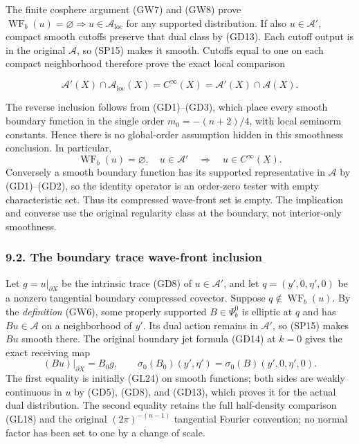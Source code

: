 \documentclass[
  11pt,
]{article}
\begin{document}
The finite cosphere argument (GW7) and (GW8) prove
\(\operatorname{WF}_b(u)=\varnothing\Rightarrow
u\in\mathcal A_{\mathrm{loc}}\) for any supported distribution. If also
\(u\in\mathcal A'\), compact smooth cutoffs preserve that dual class by
(GD13). Each cutoff output is in the original \(\mathcal A\), so (SP15)
makes it smooth. Cutoffs equal to one on each compact neighborhood
therefore prove the exact local comparison

\[
 \mathcal A'(X)\cap\mathcal A_{\mathrm{loc}}(X)
   =C^\infty(X)=\mathcal A'(X)\cap\mathcal A(X).
 \tag{SC2a}
\]

The reverse inclusion follows from (GD1)--(GD3), which place every
smooth boundary function in the single order \(m_0=-(n+2)/4\), with
local seminorm constants. Hence there is no global-order assumption
hidden in this smoothness conclusion. In particular, \[
 \operatorname{WF}_b(u)=\varnothing,\quad u\in\mathcal A'
        \quad\Longrightarrow\quad u\in C^\infty(X).
 \tag{SC3}
\] Conversely a smooth boundary function has its supported
representative in \(\mathcal A\) by (GD1)--(GD2), so the identity
operator is an order-zero tester with empty characteristic set. Thus its
compressed wave-front set is empty. The implication and converse use the
original regularity class at the boundary, not interior-only smoothness.

\subsubsection{9.2. The boundary trace wave-front
inclusion}\label{the-boundary-trace-wave-front-inclusion}

Let \(g=u|_{\partial X}\) be the intrinsic trace (GD8) of
\(u\in\mathcal A'\), and let \(q=(y',0,\eta',0)\) be a nonzero
tangential boundary compressed covector. Suppose
\(q\notin\operatorname{WF}_b(u)\). By the \emph{definition} (GW6), some
properly supported \(B\in\Psi_b^0\) is elliptic at \(q\) and has
\(Bu\in\mathcal A\) on a neighborhood of \(y'\). Its dual action remains
in \(\mathcal A'\), so (SP15) makes \(Bu\) smooth there. The original
boundary jet formula (GD14) at \(k=0\) gives the exact receiving map \[
 (Bu)|_{\partial X}=B_0 g,
 \qquad
 \sigma_0(B_0)(y',\eta')
    =\sigma_0(B)(y',0,\eta',0).
 \tag{SC4}
\] The first equality is initially (GL24) on smooth functions; both
sides are weakly continuous in \(u\) by (GD5), (GD8), and (GD13), which
proves it for the actual dual distribution. The second equality retains
the full half-density comparison (GL18) and the original
\((2\pi)^{-(n-1)}\) tangential Fourier convention; no normal factor has
been set to one by a change of scale.
\end{document}
